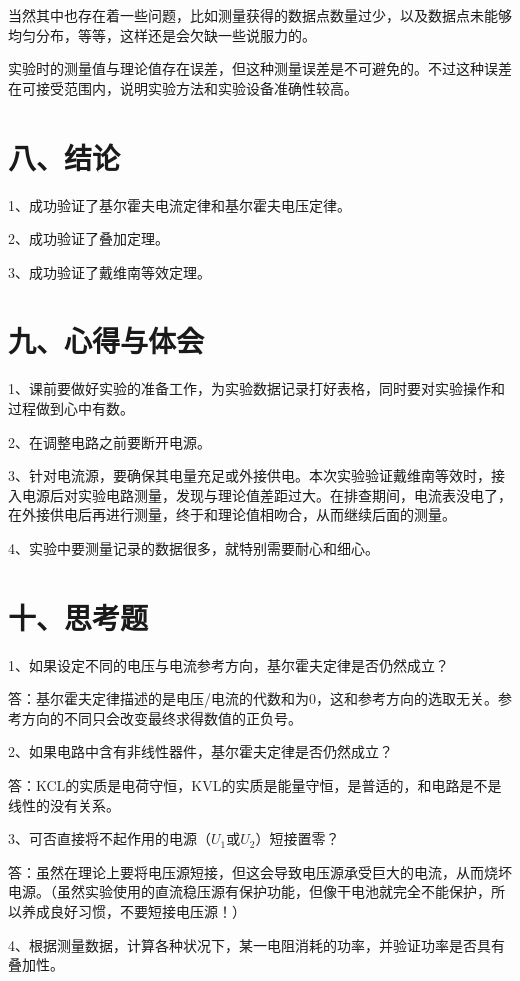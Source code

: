 \documentclass[12pt,a4paper]{article}
\begin{document}
当然其中也存在着一些问题，比如测量获得的数据点数量过少，以及数据点未能够均匀分布，等等，这样还是会欠缺一些说服力的。


实验时的测量值与理论值存在误差，但这种测量误差是不可避免的。不过这种误差在可接受范围内，说明实验方法和实验设备准确性较高。

\section*{八、结论}

1、成功验证了基尔霍夫电流定律和基尔霍夫电压定律。

2、成功验证了叠加定理。

3、成功验证了戴维南等效定理。

\section*{九、心得与体会}

1、课前要做好实验的准备工作，为实验数据记录打好表格，同时要对实验操作和过程做到心中有数。

2、在调整电路之前要断开电源。

3、针对电流源，要确保其电量充足或外接供电。本次实验验证戴维南等效时，接入电源后对实验电路测量，发现与理论值差距过大。在排查期间，电流表没电了，在外接供电后再进行测量，终于和理论值相吻合，从而继续后面的测量。

4、实验中要测量记录的数据很多，就特别需要耐心和细心。

\section*{十、思考题}

1、如果设定不同的电压与电流参考方向，基尔霍夫定律是否仍然成立？

答：基尔霍夫定律描述的是电压/电流的代数和为0，这和参考方向的选取无关。参考方向的不同只会改变最终求得数值的正负号。

2、如果电路中含有非线性器件，基尔霍夫定律是否仍然成立？

答：KCL的实质是电荷守恒，KVL的实质是能量守恒，是普适的，和电路是不是线性的没有关系。

3、可否直接将不起作用的电源（$U_{1}$或$U_{2}$）短接置零？

答：虽然在理论上要将电压源短接，但这会导致电压源承受巨大的电流，从而烧坏电源。（虽然实验使用的直流稳压源有保护功能，但像干电池就完全不能保护，所以养成良好习惯，不要短接电压源！）

4、根据测量数据，计算各种状况下，某一电阻消耗的功率，并验证功率是否具有叠加性。
\end{document}
